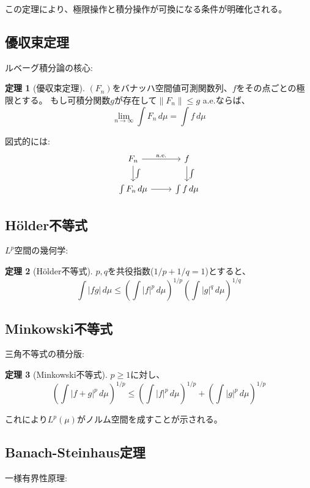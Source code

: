 \documentclass[a4paper,12pt]{ltjsarticle}
\theoremstyle{definition}
\newtheorem{theorem}{定理}[section]
\begin{document}
この定理により、極限操作と積分操作が可換になる条件が明確化される。

\subsection{優収束定理}
ルベーグ積分論の核心:

\begin{theorem}[優収束定理]\label{thm:dominated-convergence}
$(F_n)$をバナッハ空間値可測関数列、$f$をその点ごとの極限とする。
もし可積分関数$g$が存在して$\|F_n\| \le g$ a.e.ならば、
\[
\lim_{n \to \infty} \int F_n \, d\mu = \int f \, d\mu
\]
\end{theorem}

図式的には:
\begin{equation*}
\begin{tikzcd}
F_n \arrow[r, "\text{a.e.}"] \arrow[d, "\int"] & f \arrow[d, "\int"] \\
\int F_n \, d\mu \arrow[r] & \int f \, d\mu
\end{tikzcd}
\end{equation*}

\subsection{H\"older不等式}
$L^p$空間の幾何学:

\begin{theorem}[H\"older不等式]\label{thm:holder}
$p, q$を共役指数($1/p + 1/q = 1$)とすると、
\[
\int |fg| \, d\mu \le \left(\int |f|^p \, d\mu\right)^{1/p} \left(\int |g|^q \, d\mu\right)^{1/q}
\]
\end{theorem}

\subsection{Minkowski不等式}
三角不等式の積分版:

\begin{theorem}[Minkowski不等式]\label{thm:minkowski}
$p \ge 1$に対し、
\[
\left(\int |f+g|^p \, d\mu\right)^{1/p} \le \left(\int |f|^p \, d\mu\right)^{1/p} + \left(\int |g|^p \, d\mu\right)^{1/p}
\]
\end{theorem}

これにより$L^p(\mu)$がノルム空間を成すことが示される。

\subsection{Banach-Steinhaus定理}
一様有界性原理:
\end{document}
